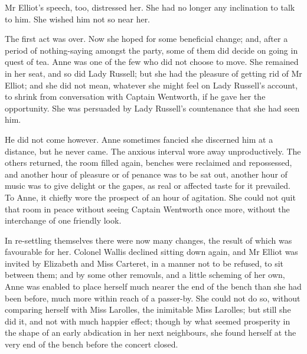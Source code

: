 Mr Elliot's speech, too, distressed her. She had no longer any inclination to talk to him. She wished him not so near her.

The first act was over. Now she hoped for some beneficial change; and, after a period of nothing-saying amongst the party, some of them did decide on going in quest of tea. Anne was one of the few who did not choose to move. She remained in her seat, and so did Lady Russell; but she had the pleasure of getting rid of Mr Elliot; and she did not mean, whatever she might feel on Lady Russell's account, to shrink from conversation with Captain Wentworth, if he gave her the opportunity. She was persuaded by Lady Russell's countenance that she had seen him.

He did not come however. Anne sometimes fancied she discerned him at a distance, but he never came. The anxious interval wore away unproductively. The others returned, the room filled again, benches were reclaimed and repossessed, and another hour of pleasure or of penance was to be sat out, another hour of music was to give delight or the gapes, as real or affected taste for it prevailed. To Anne, it chiefly wore the prospect of an hour of agitation. She could not quit that room in peace without seeing Captain Wentworth once more, without the interchange of one friendly look.

In re-settling themselves there were now many changes, the result of which was favourable for her. Colonel Wallis declined sitting down again, and Mr Elliot was invited by Elizabeth and Miss Carteret, in a manner not to be refused, to sit between them; and by some other removals, and a little scheming of her own, Anne was enabled to place herself much nearer the end of the bench than she had been before, much more within reach of a passer-by. She could not do so, without comparing herself with Miss Larolles, the inimitable Miss Larolles; but still she did it, and not with much happier effect; though by what seemed prosperity in the shape of an early abdication in her next neighbours, she found herself at the very end of the bench before the concert closed.

